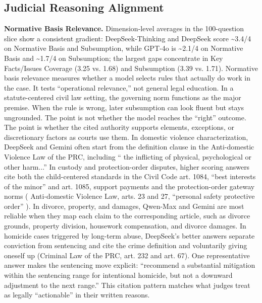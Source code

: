 \documentclass[pdflatex,sn-mathphys-ay]{sn-jnl}%
\theoremstyle{thmstyleone}%
\theoremstyle{thmstyletwo}%
\theoremstyle{thmstylethree}%
\begin{document}
\subsection{Judicial Reasoning Alignment}\label{subsec5}
\textbf{Normative Basis Relevance.} Dimension-level averages in the 100-question slice show a consistent gradient: DeepSeek‑Thinking and DeepSeek score \textasciitilde3.4/4 on Normative Basis and Subsumption, while GPT‑4o is \textasciitilde2.1/4 on Normative Basis and \textasciitilde1.7/4 on Subsumption; the largest gaps concentrate in Key Facts/Issues Coverage (3.25 vs. 1.68) and Subsumption (3.39 vs. 1.71). Normative basis relevance measures whether a model selects rules that actually do work in the case. It tests ``operational relevance,'' not general legal education. In a statute-centered civil law setting, the governing norm functions as the major premise. When the rule is wrong, later subsumption can look fluent but stays ungrounded. The point is not whether the model reaches the ``right'' outcome. The point is whether the cited authority supports elements, exceptions, or discretionary factors as courts use them. In domestic violence characterization, DeepSeek and Gemini often start from the definition clause in the Anti-domestic Violence Law of the PRC, including `` the inflicting of physical, psychological or other harm...'' In custody and protection-order disputes, higher scoring answers cite both the child-centered standards in the Civil Code art. 1084, ``best interests of the minor'' and art. 1085, support payments and the protection-order gateway norms ( Anti-domestic Violence Law, arts. 23 and 27, ``personal safety protective order'' ). In divorce, property, and damages, Qwen-Max and Gemini are most reliable when they map each claim to the corresponding article, such as divorce grounds, property division, housework compensation, and divorce damages. In homicide cases triggered by long-term abuse, DeepSeek's better answers separate conviction from sentencing and cite the crime definition and voluntarily giving oneself up (Criminal Law of the PRC, art. 232 and art. 67). One representative answer makes the sentencing move explicit: ``recommend a substantial mitigation within the sentencing range for intentional homicide, but not a downward adjustment to the next range.'' This citation pattern matches what judges treat as legally ``actionable'' in their written reasons.
\end{document}
